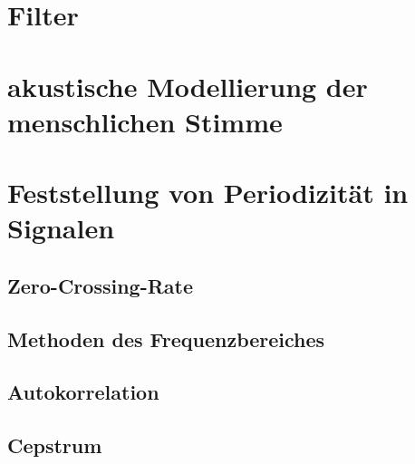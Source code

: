 \section{Filter}
\label{sec:filter}

\section{akustische Modellierung der menschlichen Stimme}
\section{Feststellung von Periodizität in Signalen}
\subsection{Zero-Crossing-Rate}
\subsection{Methoden des Frequenzbereiches}
\subsection{Autokorrelation}
\subsection{Cepstrum}